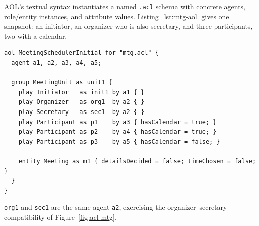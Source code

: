 %
%

AOL's textual syntax instantiates a named \texttt{.acl} schema with concrete agents, role/entity instances, and attribute values. Listing~\ref{lst:mtg-aol} gives one snapshot: an initiator, an organizer who is also secretary, and three participants, two with a calendar.

\begin{lstlisting}[basicstyle=\ttfamily\scriptsize,frame=single,breaklines=true,caption={Initial object snapshot in \texttt{mtg\_initial.aol}.},label={lst:mtg-aol}]
aol MeetingSchedulerInitial for "mtg.acl" {
  agent a1, a2, a3, a4, a5;

  group MeetingUnit as unit1 {
    play Initiator   as init1 by a1 { }
    play Organizer   as org1  by a2 { }
    play Secretary   as sec1  by a2 { }
    play Participant as p1    by a3 { hasCalendar = true; }
    play Participant as p2    by a4 { hasCalendar = true; }
    play Participant as p3    by a5 { hasCalendar = false; }

    entity Meeting as m1 { detailsDecided = false; timeChosen = false; }
  }
}
\end{lstlisting}

\texttt{org1} and \texttt{sec1} are the same agent \texttt{a2}, exercising the organizer--secretary compatibility of Figure~\ref{fig:acl-mtg}.
